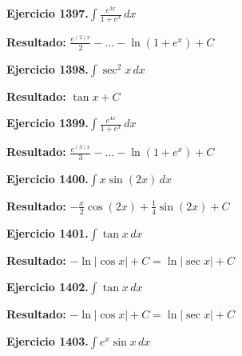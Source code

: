 \documentclass[10pt,a4paper]{article}
\begin{document}
\begin{ejbox}
\textbf{Ejercicio 1397.}\quad $\int \frac{e^{3x}}{1+e^{x}}\,dx$
\end{ejbox}

\begin{solbox}
\textbf{Resultado:} \(\displaystyle \frac{e^{(2)x}}{2} - ... - \ln(1+e^x) + C\)
\end{solbox}

\begin{ejbox}
\textbf{Ejercicio 1398.}\quad $\int \sec^2 x\,dx$
\end{ejbox}

\begin{solbox}
\textbf{Resultado:} \(\displaystyle \tan x + C\)
\end{solbox}

\newpage
\begin{ejbox}
\textbf{Ejercicio 1399.}\quad $\int \frac{e^{4x}}{1+e^{x}}\,dx$
\end{ejbox}

\begin{solbox}
\textbf{Resultado:} \(\displaystyle \frac{e^{(3)x}}{3} - ... - \ln(1+e^x) + C\)
\end{solbox}

\begin{ejbox}
\textbf{Ejercicio 1400.}\quad $\int x \sin(2x)\,dx$
\end{ejbox}

\begin{solbox}
\textbf{Resultado:} \(\displaystyle -\frac{x}{2}\cos(2x) + \frac{1}{4}\sin(2x) + C\)
\end{solbox}

\begin{ejbox}
\textbf{Ejercicio 1401.}\quad $\int \tan x\,dx$
\end{ejbox}

\begin{solbox}
\textbf{Resultado:} \(\displaystyle -\ln|\cos x| + C = \ln|\sec x| + C\)
\end{solbox}

\newpage
\begin{ejbox}
\textbf{Ejercicio 1402.}\quad $\int \tan x\,dx$
\end{ejbox}

\begin{solbox}
\textbf{Resultado:} \(\displaystyle -\ln|\cos x| + C = \ln|\sec x| + C\)
\end{solbox}

\begin{ejbox}
\textbf{Ejercicio 1403.}\quad $\int e^x\sin x\,dx$
\end{ejbox}
\end{document}
